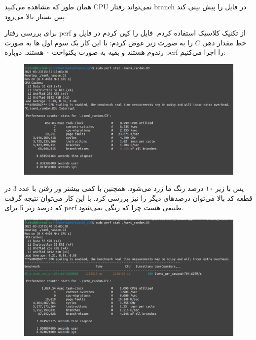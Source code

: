 \begin{enumerate}
\begin{latin}
\begin{itemize}
\begin{figure}[H]
        \end{figure}
    \end{itemize}
    \end{latin}
    همان طور که مشاهده می‌کنید CPU نمی‌تواند رفتار branch در فایل
    را پیش بینی کند پس  بسیار بالا می‌رود.

    برای بررسی رفتار perf از تکنیک کلاسیک  استفاده کردم.
    فایل  را کپی کردم در فایل  و خط مقدار دهی $C$
    را به صورت زیر عوض کردم:
    با این کار یک سوم اول ها به صورت رندوم هستند و بقیه به صورت یکنواخت ۰ هستند.
    دوباره perf را اجرا می‌کنیم:
    \begin{figure}[H]
        \centerline{\includegraphics[scale=0.3]{pics/5/B/semi-random-yellow.png}}
    \end{figure}
    پس با زیر ۱۰ درصد  رنگ ما زرد می‌شود.
    همچنین با کمی بیشتر ور رفتن با عدد 3 در قطعه کد بالا می‌توان درصد‌های دیگر را نیز بررسی کرد. 
    با این کار می‌توان نتیجه گرفت که درصد زیر 5 برای perf طبیعی هست چرا که رنگی نمی‌شود.
    \begin{figure}[H]
        \centerline{\includegraphics[scale=0.3]{pics/5/B/semi-random-white.png}}
    \end{figure}


\end{enumerate}
